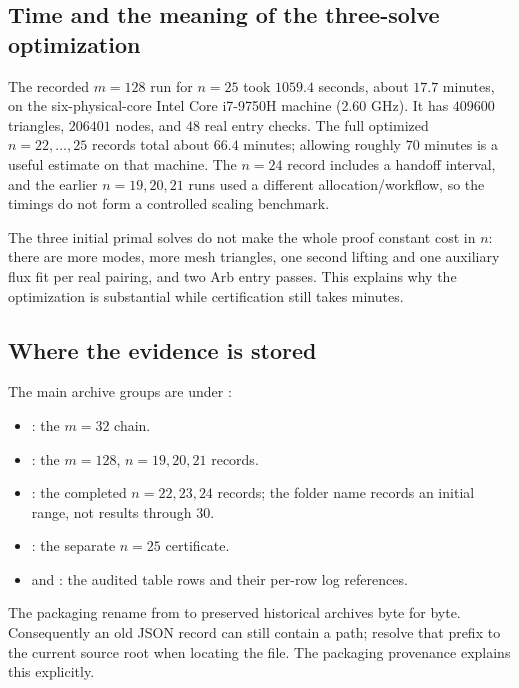 \subsection{Time and the meaning of the three-solve optimization}
The recorded $m=128$ run for $n=25$ took $1059.4$ seconds, about
$17.7$ minutes, on the six-physical-core Intel Core i7-9750H machine
(2.60 GHz). It has $409600$ triangles, $206401$ nodes, and $48$ real
entry checks. The full optimized $n=22,\ldots,25$ records total about
$66.4$ minutes; allowing roughly $70$ minutes is a useful estimate on that
machine. The $n=24$ record includes a handoff interval, and the earlier
$n=19,20,21$ runs used a different allocation/workflow, so the timings do
not form a controlled scaling benchmark.

The three initial primal solves do not make the whole proof constant
cost in $n$: there are more modes, more mesh triangles, one second lifting
and one auxiliary flux fit per real pairing, and two Arb entry passes.
This explains why the optimization is substantial while certification
still takes minutes.

\subsection{Where the evidence is stored}
The main archive groups are under :
\begin{itemize}
\item {}: the $m=32$ chain.
\item {}: the $m=128$, $n=19,20,21$ records.
\item {}: the completed $n=22,23,24$
records; the folder name records an initial range, not results through $30$.
\item {}: the separate $n=25$ certificate.
\item {} and
: the audited table rows and their
per-row log references.
\end{itemize}
The packaging rename from  to 
preserved historical archives byte for byte. Consequently an old JSON
record can still contain a  path; resolve that
prefix to the current source root when locating the file. The packaging
provenance explains this explicitly.

